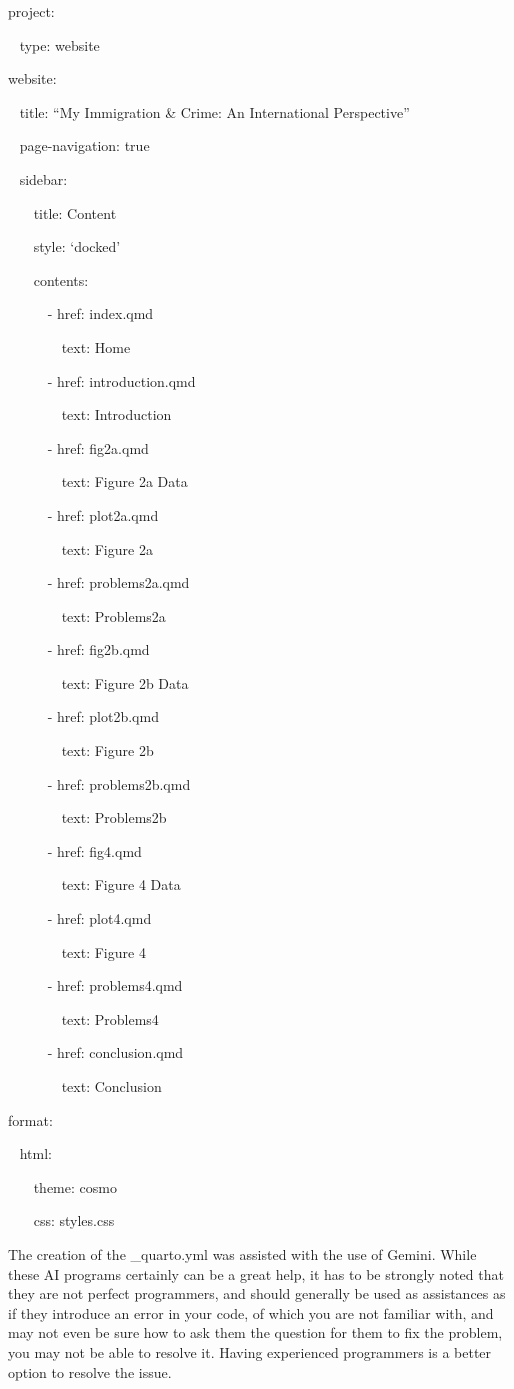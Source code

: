\documentclass[
  man,
  floatsintext,
  longtable,
  nolmodern,
  notxfonts,
  notimes,
  colorlinks=true,linkcolor=blue,citecolor=blue,urlcolor=blue]{apa7}
\begin{document}
project:

~ type: website

website:

~ title: ``My Immigration \& Crime: An International Perspective''

~ page-navigation: true

~ sidebar:

~~~ title: Content

~~~ style: `docked'

~~~ contents:

~~~~~ - href: index.qmd

~~~~~~~ text: Home

~~~~~ - href: introduction.qmd

~~~~~~~ text: Introduction

~~~~~ - href: fig2a.qmd

~~~~~~~ text: Figure 2a Data

~~~~~ - href: plot2a.qmd

~~~~~~~ text: Figure 2a

~~~~~ - href: problems2a.qmd

~~~~~~~ text: Problems2a

~~~~~ - href: fig2b.qmd

~~~~~~~ text: Figure 2b Data

~~~~~ - href: plot2b.qmd

~~~~~~~ text: Figure 2b

~~~~~ - href: problems2b.qmd

~~~~~~~ text: Problems2b

~~~~~ - href: fig4.qmd

~~~~~~~ text: Figure 4 Data

~~~~~ - href: plot4.qmd

~~~~~~~ text: Figure 4

~~~~~ - href: problems4.qmd

~~~~~~~ text: Problems4

~~~~~ - href: conclusion.qmd

~~~~~~~ text: Conclusion

format:

~ html:

~~~ theme: cosmo

~~~ css: styles.css

The creation of the \_quarto.yml was assisted with the use of Gemini.
While these AI programs certainly can be a great help, it has to be
strongly noted that they are not perfect programmers, and should
generally be used as assistances as if they introduce an error in your
code, of which you are not familiar with, and may not even be sure how
to ask them the question for them to fix the problem, you may not be
able to resolve it. Having experienced programmers is a better option to
resolve the issue.
\end{document}
